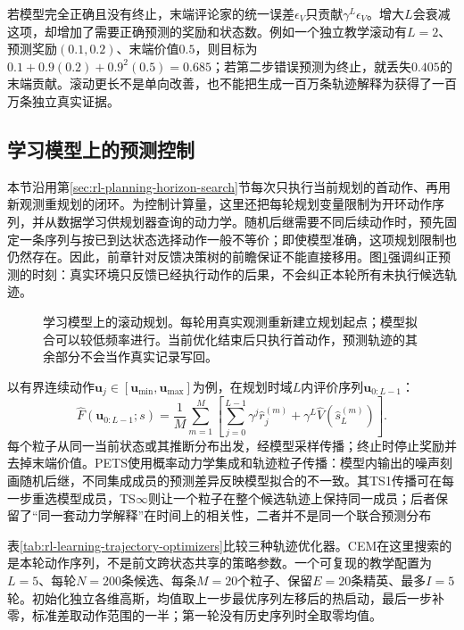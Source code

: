 若模型完全正确且没有终止，末端评论家的统一误差$\epsilon_V$只贡献$\gamma^L\epsilon_V$。增大$L$会衰减这项，却增加了需要正确预测的奖励和状态数。例如一个独立教学滚动有$L=2$、预测奖励$(0.1,0.2)$、末端价值$0.5$，则目标为$0.1+0.9(0.2)+0.9^2(0.5)=0.685$；若第二步错误预测为终止，就丢失$0.405$的末端贡献。滚动更长不是单向改善，也不能把生成一百万条轨迹解释为获得了一百万条独立真实证据。

\subsection{学习模型上的预测控制}
\label{sec:rl-learning-learned-mpc}

本节沿用第\ref{sec:rl-planning-horizon-search}节每次只执行当前规划的首动作、再用新观测重规划的闭环。为控制计算量，这里还把每轮规划变量限制为开环动作序列，并从数据学习供规划器查询的动力学。随机后继需要不同后续动作时，预先固定一条序列与按已到达状态选择动作一般不等价；即使模型准确，这项规划限制也仍然存在。因此，前章针对反馈决策树的前瞻保证不能直接移用。图\ref{fig:rl-learning-mpc}强调纠正预测的时刻：真实环境只反馈已经执行动作的后果，不会纠正本轮所有未执行候选轨迹。

\begin{figure}[t]
  \centering
  
  \caption{学习模型上的滚动规划。每轮用真实观测重新建立规划起点；模型拟合可以较低频率进行。当前优化结束后只执行首动作，预测轨迹的其余部分不会当作真实记录写回。}
  \label{fig:rl-learning-mpc}
\end{figure}

以有界连续动作$\bm u_j\in[\bm u_{\min},\bm u_{\max}]$为例，在规划时域$L$内评价序列$\bm u_{0:L-1}$：
\begin{equation}
  \widehat F(\bm u_{0:L-1};s)
  =\frac1M\sum_{m=1}^{M}
  \left[\sum_{j=0}^{L-1}\gamma^j\widehat r_j^{(m)}
          +\gamma^L\widehat V(\widehat s_L^{(m)})\right].
  \label{eq:rl-learning-particle-mpc}
\end{equation}
每个粒子从同一当前状态或其推断分布出发，经模型采样传播；终止时停止奖励并去掉末端价值。PETS使用概率动力学集成和轨迹粒子传播：模型内输出的噪声刻画随机后继，不同集成成员的预测差异反映模型拟合的不一致。其TS1传播可在每一步重选模型成员，TS$\infty$则让一个粒子在整个候选轨迹上保持同一成员；后者保留了“同一套动力学解释”在时间上的相关性，二者并不是同一个联合预测分布

表\ref{tab:rl-learning-trajectory-optimizers}比较三种轨迹优化器。CEM在这里搜索的是本轮动作序列，不是前文跨状态共享的策略参数。一个可复现的教学配置为$L=5$、每轮$N=200$条候选、每条$M=20$个粒子、保留$E=20$条精英、最多$I=5$轮。初始化独立各维高斯，均值取上一步最优序列左移后的热启动，最后一步补零，标准差取动作范围的一半；第一轮没有历史序列时全取零均值。

